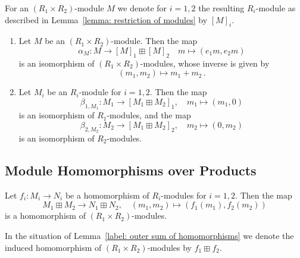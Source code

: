 

\begin{definition}
  For an $(R_1 \times R_2)$-module $M$ we denote for $i = 1, 2$ the resulting $R_i$-module as described in Lemma~\ref{lemma: restriction of modules} by $[M]_i$.
\end{definition}


\begin{theorem}
  \label{theorem: equivalence of modules for objects}
  \leavevmode
  \begin{enumerate}
    \item
      Let $M$ be an $(R_1 \times R_2)$-module.
      Then the map
      \[
                \alpha_M
        \colon  M
        \to     [M]_1 \boxplus [M]_2
        \quad   m
        \mapsto (e_1 m, e_2 m)
      \]
      is an isomorphism of $(R_1 \times R_2)$-modules, whose inverse is given by
      \[
                (m_1, m_2)
        \mapsto m_1 + m_2 \,.
      \]
    \item
      Let $M_i$ be an $R_i$-module for $i = 1, 2$.
      Then the map
      \[
                \beta_{1, M_1}
        \colon  M_1
        \to     [M_1 \boxplus M_2]_1,
        \quad   m_1
        \mapsto (m_1, 0)
      \]
      is an isomorphism of $R_1$-modules, and the map
      \[
                \beta_{2, M_2}
        \colon  M_2
        \to     [M_1 \boxplus M_2]_2,
        \quad   m_2
        \mapsto (0, m_2)
      \]
      is an isomorphism of $R_2$-modules.
  \end{enumerate}
\end{theorem}





\subsection{Module Homomorphisms over Products}


\begin{lemma}
  \label{label: outer sum of homomorphisms}
  Let $f_i \colon M_i \to N_i$ be a homomorphism of $R_i$-modules for $i = 1, 2$.
  Then the map
  \[
            M_1 \boxplus M_2
    \to     N_1 \boxplus N_2,
    \quad   (m_1, m_2)
    \mapsto (f_1(m_1), f_2(m_2))
  \]
  is a homomorphism of $(R_1 \times R_2)$-modules.
\end{lemma}




\begin{definition}
  In the situation of Lemma~\ref{label: outer sum of homomorphisms} we denote the induced homomorphism of $(R_1 \times R_2)$-modules by $f_1 \boxplus f_2$.
\end{definition}


